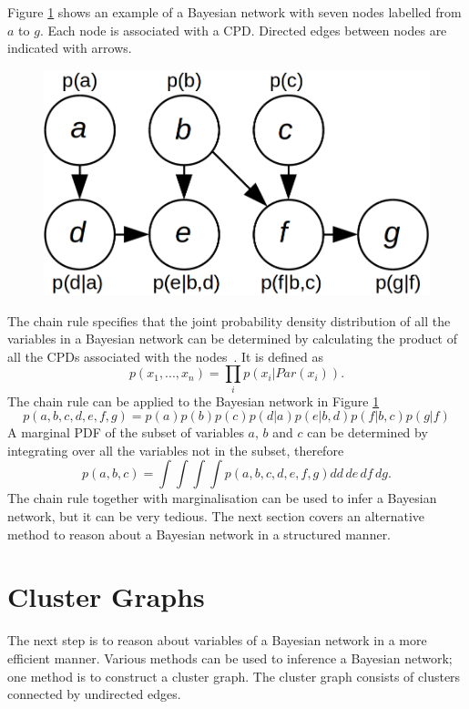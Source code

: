 \documentclass[12pt,oneside,openany,a4paper, %
afrikaans,english,
]{memoir}
\numberwithin{equation}{chapter}
\begin{document}
{Figure \ref{fig:bays_pgm} shows an example of a Bayesian network with seven nodes labelled from $a$ to $g$. Each node is associated with a CPD. Directed edges between nodes are indicated with arrows.
\begin{figure}[H]
  \includegraphics[width=0.5\linewidth]{Figures/bayesian_pgm.png}
  \centering
  \caption[Bayesian network example]{}
  \label{fig:bays_pgm}
\end{figure}
The chain rule specifies that the joint probability density distribution of all the variables in a Bayesian network can be determined by calculating the product of all the CPDs associated with the nodes~\citep{koller}. It is defined as
\begin{equation}
p(x_1, ..., x_n) = \prod_i p(x_i|Par(x_i)).
\end{equation}
The chain rule can be applied to the Bayesian network in Figure \ref{fig:bays_pgm}
\begin{equation}
p(a,b,c,d,e,f,g) = p(a)p(b)p(c)p(d|a)p(e|b,d)p(f|b,c)p(g|f)
\end{equation}
A marginal PDF of the subset of variables $a$, $b$ and $c$ can be determined by integrating over all the variables not in the subset, therefore
\begin{equation}
p(a,b,c) = \int\int\int\int p(a,b,c,d,e,f,g)dd\,de\,df\,dg.
\end{equation}
The chain rule together with marginalisation can be used to infer a Bayesian network, but it can be very tedious. The next section covers an alternative method to reason about a Bayesian network in a structured manner.
\section{Cluster Graphs}
The next step is to reason about variables of a Bayesian network in a more efficient manner. Various methods can be used to inference a Bayesian network; one method is to construct a cluster graph. The cluster graph consists of clusters connected by undirected edges.

}
\end{document}

